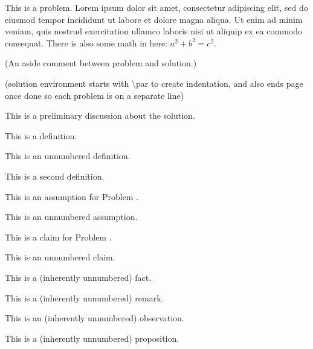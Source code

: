 \documentclass{article}
\begin{document}
\begin{problem} 
    This is a problem. Lorem ipsum dolor sit amet, consectetur adipiscing elit, sed do eiusmod tempor incididunt ut labore et dolore magna aliqua. Ut enim ad minim veniam, quis nostrud exercitation ullamco laboris nisi ut aliquip ex ea commodo consequat. There is also some math in here: $a^2 + b^2 = c^2$.
\end{problem}
(An aside comment between problem and solution.)
\begin{solution}
    (solution environment starts with \textbackslash{par} to create indentation, and also ends page once done so each problem is on a separate line)
    \par This is a preliminary discussion about the solution.
    \begin{definition}
        This is a definition.
    \end{definition}
    \begin{definition*}
        This is an unnumbered definition.
    \end{definition*}
    \begin{definition}
        This is a second definition.
    \end{definition}
    \begin{assumption}
        This is an assumption for Problem \theproblem.
    \end{assumption}
    \begin{assumption*}
        This is an unnumbered assumption.
    \end{assumption*}
    \begin{claim}
        This is a claim for Problem \theproblem.
    \end{claim}
    \begin{claim*}
        This is an unnumbered claim.
    \end{claim*}
    \begin{fact}
        This is a (inherently unnumbered) fact.
    \end{fact}
    \begin{remark}
        This is a (inherently unnumbered) remark.
    \end{remark}
    \begin{observation}
        This is an (inherently unnumbered) observation.
    \end{observation}
    \begin{proposition}
        This is a (inherently unnumbered) proposition.
    \end{proposition}

\end{solution}
\end{document}

